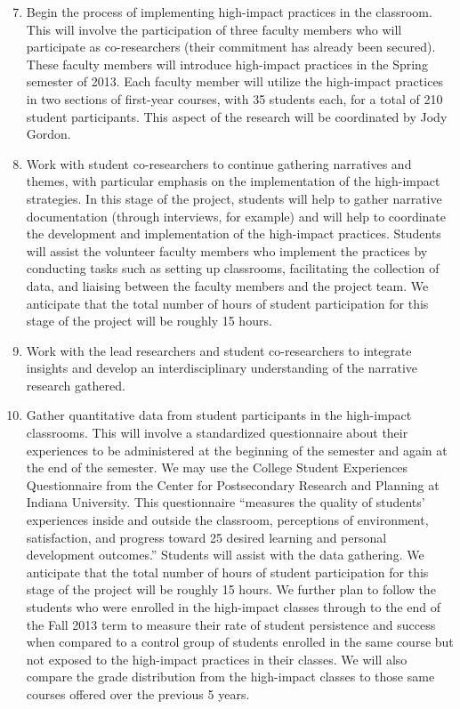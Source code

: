 \documentclass[letterpaper,10pt,headsepline]{scrreprt}
\begin{document}
\begin{enumerate}
\setcounter{enumi}{6}
\item Begin the process of implementing high-impact practices in the
  classroom. This will involve the participation of three faculty members who
  will participate as co-researchers (their commitment has already been
  secured). These faculty members will introduce high-impact practices in the
  Spring semester of 2013. Each faculty member will utilize the high-impact
  practices in two sections of first-year courses, with 35 students each, for
  a total of 210 student participants. This aspect of the research will be
  coordinated by Jody Gordon.

\item Work with student co-researchers to continue gathering narratives and
  themes, with particular emphasis on the implementation of the high-impact
  strategies. In this stage of the project, students will help to gather
  narrative documentation (through interviews, for example) and will help to
  coordinate the development and implementation of the high-impact practices.
  Students will assist the volunteer faculty members who implement the
  practices by conducting tasks such as setting up classrooms, facilitating
  the collection of data, and liaising between the faculty members and the
  project team. We anticipate that the total number of hours of student
  participation for this stage of the project will be roughly 15 hours.

\item Work with the lead researchers and student co-researchers to integrate
  insights and develop an interdisciplinary understanding of the narrative
  research gathered.

\item Gather quantitative data from student participants in the high-impact
  classrooms. This will involve a standardized questionnaire about their
  experiences to be administered at the beginning of the semester and again at
  the end of the semester. We may use the College Student Experiences
  Questionnaire from the Center for Postsecondary Research and Planning at
  Indiana University. This questionnaire ``measures the quality of students'
  experiences inside and outside the classroom, perceptions of environment,
  satisfaction, and progress toward 25 desired learning and personal
  development outcomes.'' Students will assist with the data gathering. We
  anticipate that the total number of hours of student participation for this
  stage of the project will be roughly 15 hours. We further plan to follow the
  students who were enrolled in the high-impact classes through to the end
  of the Fall 2013 term to measure their rate of student persistence and
  success when compared to a control group of students enrolled in the same
  course but not exposed to the high-impact practices in their classes. We
  will also compare the grade distribution from the high-impact classes to
  those same courses offered over the previous 5 years.


\end{enumerate}
\end{document}
